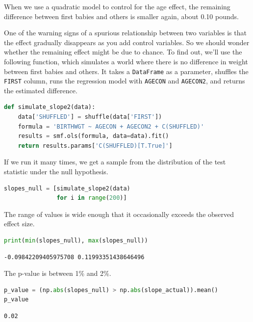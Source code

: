 When we use a quadratic model to control for the age effect, the
remaining difference between first babies and others is smaller again,
about 0.10 pounds.

One of the warning signs of a spurious relationship between two
variables is that the effect gradually disappears as you add control
variables. So we should wonder whether the remaining effect might be due
to chance. To find out, we'll use the following function, which
simulates a world where there is no difference in weight between first
babies and others. It takes a \passthrough{\lstinline!DataFrame!} as a
parameter, shuffles the \passthrough{\lstinline!FIRST!} column, runs the
regression model with \passthrough{\lstinline!AGECON!} and
\passthrough{\lstinline!AGECON2!}, and returns the estimated difference.

\begin{lstlisting}[language=Python,style=source]
def simulate_slope2(data):
    data['SHUFFLED'] = shuffle(data['FIRST'])
    formula = 'BIRTHWGT ~ AGECON + AGECON2 + C(SHUFFLED)'
    results = smf.ols(formula, data=data).fit()
    return results.params['C(SHUFFLED)[T.True]']
\end{lstlisting}

If we run it many times, we get a sample from the distribution of the
test statistic under the null hypothesis.

\begin{lstlisting}[language=Python,style=source]
slopes_null = [simulate_slope2(data)
               for i in range(200)]
\end{lstlisting}

The range of values is wide enough that it occasionally exceeds the
observed effect size.

\begin{lstlisting}[language=Python,style=source]
print(min(slopes_null), max(slopes_null))
\end{lstlisting}

\begin{lstlisting}[style=output]
-0.09842209405975708 0.11993351438646496
\end{lstlisting}

The p-value is between 1\% and 2\%.

\begin{lstlisting}[language=Python,style=source]
p_value = (np.abs(slopes_null) > np.abs(slope_actual)).mean()
p_value
\end{lstlisting}

\begin{lstlisting}[style=output]
0.02
\end{lstlisting}

